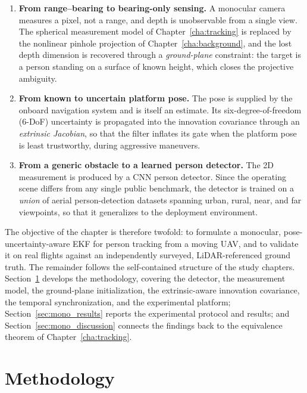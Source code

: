 \begin{enumerate}
  \item \textbf{From range--bearing to bearing-only sensing.} A monocular camera
  measures a pixel, not a range, and depth is unobservable from a single view. The
  spherical measurement model of Chapter~\ref{cha:tracking} is replaced by the
  nonlinear pinhole projection of Chapter~\ref{cha:background}, and the lost
  depth dimension is recovered through a \emph{ground-plane} constraint: the
  target is a person standing on a surface of known height, which closes the
  projective ambiguity.
  \item \textbf{From known to uncertain platform pose.} The pose is supplied by
  the onboard navigation system and is itself an estimate. Its
  six-degree-of-freedom (6-DoF) uncertainty is propagated into the innovation
  covariance through an \emph{extrinsic Jacobian}, so that the filter inflates
  its gate when the platform pose is least trustworthy, during aggressive
  maneuvers.
  \item \textbf{From a generic obstacle to a learned person detector.} The 2D
  measurement is produced by a CNN person detector. Since the operating scene
  differs from any
  single public benchmark, the detector is trained on a \emph{union} of aerial
  person-detection datasets spanning urban, rural, near, and far viewpoints, so
  that it generalizes to the deployment environment.
\end{enumerate}

The objective of the chapter is therefore twofold: to formulate a monocular,
pose-uncertainty-aware EKF for person tracking from a moving UAV, and to validate
it on real flights against an independently surveyed, LiDAR-referenced ground
truth. The remainder follows the self-contained structure of the study
chapters. Section~\ref{sec:mono_method} develops the methodology, covering the
detector, the measurement model, the ground-plane initialization, the
extrinsic-aware innovation covariance, the temporal synchronization, and the
experimental platform; Section~\ref{sec:mono_results} reports the experimental
protocol and results; and Section~\ref{sec:mono_discussion} connects the findings
back to the equivalence theorem of Chapter~\ref{cha:tracking}.

\section{Methodology}
\label{sec:mono_method}

